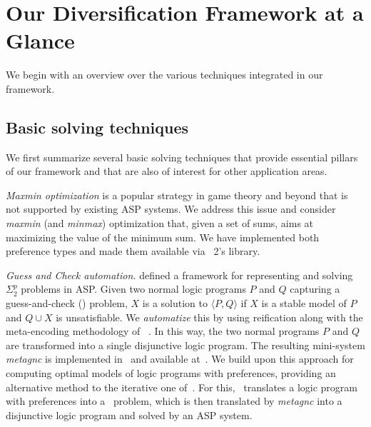 
\section{Our Diversification Framework at a Glance}\label{sec:overview}

We begin with an overview over the various techniques integrated in our framework.

\subsection{Basic solving techniques}
%
We first summarize several basic solving techniques that provide essential pillars of our framework
and that are also of interest for other application areas.

\emph{Maxmin optimization}
%
is a popular strategy in game theory and beyond that is not supported by existing ASP systems.
%
We address this issue and consider \emph{maxmin} (and \textit{minmax}) optimization that,
given a set of sums, aims at maximizing the value of the minimum sum.
%
We have implemented both preference types and made them available via \asprin~2's library.

\emph{Guess and Check automation.}
%
\cite{eitpol06a} defined a framework for representing and solving $\Sigma^p_2$ problems in ASP.
%
Given two normal logic programs $P$ and $Q$ capturing a guess-and-check (\gc) problem, 
$X$ is a solution to $\langle P,Q \rangle$ if $X$ is a stable model of $P$ and $Q \cup X$ is unsatisfiable.
%
We \emph{automatize} this by using reification along with the meta-encoding methodology of \metasp~\cite{gekasc11b}.
In this way, the two normal programs $P$ and $Q$ are transformed into a single disjunctive logic program.
The resulting mini-system \textit{metagnc} is implemented in \python\ and available at~\cite{asprin}.
%
We build upon this approach
for computing optimal models of logic programs with preferences, 
providing an alternative method to the iterative one of~\cite{brderosc15a}.
For this, 
\asprin\ translates a logic program with preferences into a \gc\ problem,
which is then translated by \textit{metagnc} into a disjunctive logic program
and solved by an ASP system.

